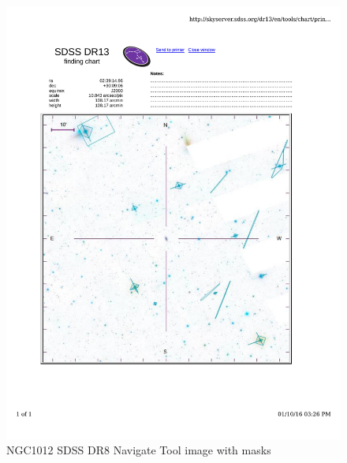 \documentclass[10pt,letterpaper]{article}
\begin{document}
\begin{figure}[h!]
\centering
\includegraphics[scale=0.7]{figures/NGC1012.pdf}
\caption{NGC1012 SDSS DR8 Navigate Tool image with masks}
\end{figure}
\end{document}
